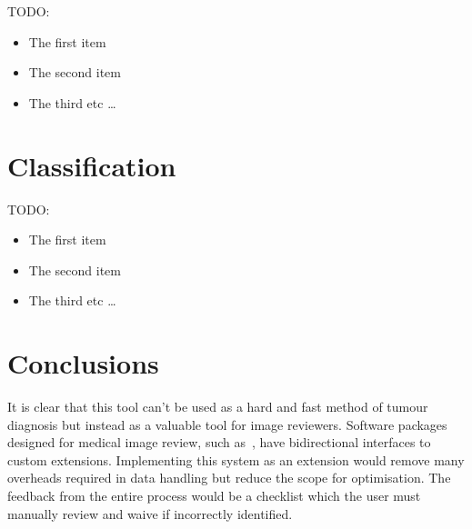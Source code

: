 \documentclass[journal]{IEEEtran}
\begin{document}
TODO:


\begin{itemize}
  \item The first item
  \item The second item
  \item The third etc \ldots
\end{itemize}









\section{Classification}
\label{sec:class}



TODO:


\begin{itemize}
  \item The first item
  \item The second item
  \item The third etc \ldots
\end{itemize}










\section{Conclusions}
\label{sec:conclusions}

It is clear that this tool can't be used as a hard and fast method of tumour diagnosis but instead as a valuable tool for image reviewers.
Software packages designed for medical image review, such as~\cite{slicer}, have bidirectional interfaces to custom extensions.
Implementing this system as an extension would remove many overheads required in data handling but reduce the scope for optimisation.
The feedback from the entire process would be a checklist which the user must manually review and waive if incorrectly identified. 












\end{document}
